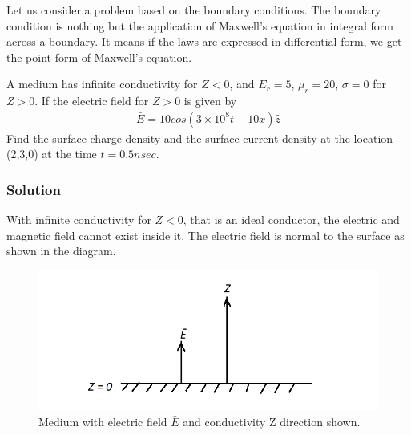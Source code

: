 Let us consider a problem based on the boundary conditions. The boundary condition is nothing but the application of Maxwell's equation in integral form across a boundary. It means if the laws are expressed in differential form, we get the point form of Maxwell's equation.
\begin{exmp}
A medium has infinite conductivity for $Z<0$, and $E_r=5$, $\mu_r = 20$, $\sigma = 0$ for $Z>0$. If the electric field for $Z>0$ is given by 
\begin{align*}
\bar{E} = 10cos(3\times 10^8t - 10x)\hat{z}
\end{align*}
Find the surface charge density and the surface current density at the location (2,3,0) at the time $t = 0.5nsec$.\\
\subsubsection*{Solution}
With infinite conductivity for $Z<0$, that is an ideal conductor, the electric and magnetic field cannot exist inside it. The electric field is normal to the surface as shown in the diagram.
\begin{figure}[h]
\centering
\includegraphics[width=1\linewidth]{./graphics/diemedium7}
\caption{Medium with electric field $\bar{E}$ and conductivity Z direction shown.}
\end{figure}


\end{exmp}
